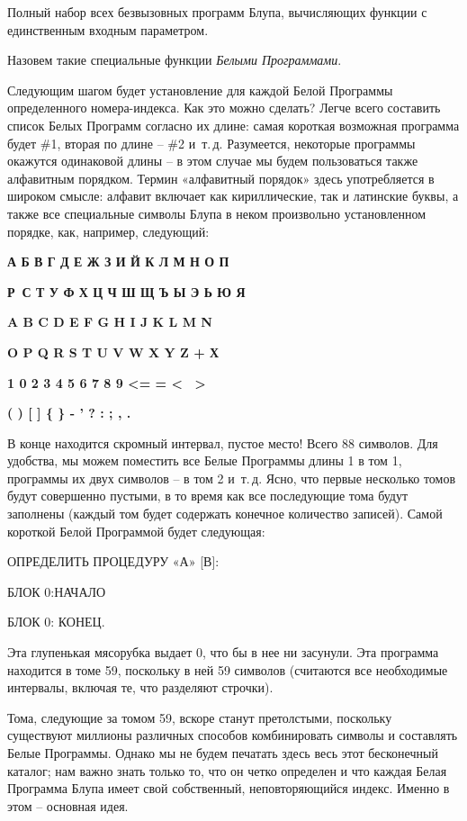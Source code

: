 \documentclass[../main.tex]{subfiles}
\begin{document}
Полный набор всех безвызовных программ Блупа, вычисляющих функции с единственным входным параметром.

Назовем такие специальные функции \emph{Белыми Программами}.

Следующим шагом будет установление для каждой Белой Программы определенного номера-индекса. Как это можно сделать? Легче всего составить список Белых Программ согласно их длине: самая короткая возможная программа будет \#1, вторая по длине \--- \#2 и~т.\,д. Разумеется, некоторые программы окажутся одинаковой длины \--- в этом случае мы будем пользоваться также алфавитным порядком. Термин «алфавитный порядок» здесь употребляется в широком смысле: алфавит включает как кириллические, так и латинские буквы, а также все специальные символы Блупа в неком произвольно установленном порядке, как, например, следующий:

\textbf{А Б В Г Д Е Ж З И Й К Л М Н О П}

\textbf{Р~С Т У Ф Х Ц Ч Ш Щ Ъ Ы Э Ь Ю Я}

\textbf{A B C D E F G H I J K L M N}

\textbf{O P Q R S T U V W X Y Z + Х}

\textbf{1 0 2 3 4 5 6 7 8 9 \textless= = \textless~ \textgreater{}}

\textbf{( ) {[} {]} \{ \} - ' ? : ; , .}

В конце находится скромный интервал, пустое место! Всего 88 символов. Для удобства, мы можем поместить все Белые Программы длины 1 в том 1, программы их двух символов \--- в том 2 и~т.\,д. Ясно, что первые несколько томов будут совершенно пустыми, в то время как все последующие тома будут заполнены (каждый том будет содержать конечное количество записей). Самой короткой Белой Программой будет следующая:

ОПРЕДЕЛИТЬ ПРОЦЕДУРУ «А» {[}В{]}:

БЛОК 0:НАЧАЛО

БЛОК 0: КОНЕЦ.

Эта глупенькая мясорубка выдает 0, что бы в нее ни засунули. Эта программа находится в томе 59, поскольку в ней 59 символов (считаются все необходимые интервалы, включая те, что разделяют строчки).

Тома, следующие за томом 59, вскоре станут претолстыми, поскольку существуют миллионы различных способов комбинировать символы и составлять Белые Программы. Однако мы не будем печатать здесь весь этот бесконечный каталог; нам важно знать только то, что он четко определен и что каждая Белая Программа Блупа имеет свой собственный, неповторяющийся индекс. Именно в этом \--- основная идея.
\end{document}
